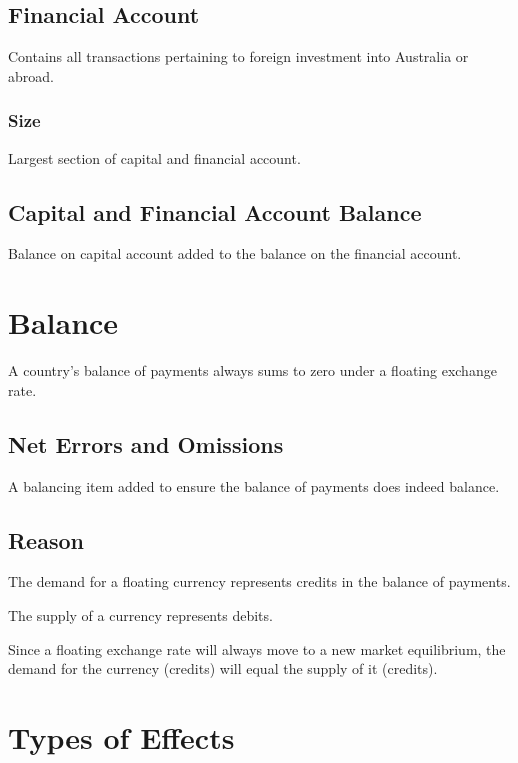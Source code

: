 \documentclass[a4paper,11pt]{article}
\begin{document}
\subsection{Financial Account}

Contains all transactions pertaining to foreign investment into Australia or
abroad.


\subsubsection{Size}

Largest section of capital and financial account.


\subsection{Capital and Financial Account Balance}

Balance on capital account added to the balance on the financial account.




\section{Balance}

A country's balance of payments always sums to zero under a floating exchange
rate.


\subsection{Net Errors and Omissions}

A balancing item added to ensure the balance of payments does indeed balance.


\subsection{Reason}

The demand for a floating currency represents credits in the balance of
payments.

The supply of a currency represents debits.

Since a floating exchange rate will always move to a new market equilibrium,
the demand for the currency (credits) will equal the supply of it (credits).



\section{Types of Effects}
\end{document}
